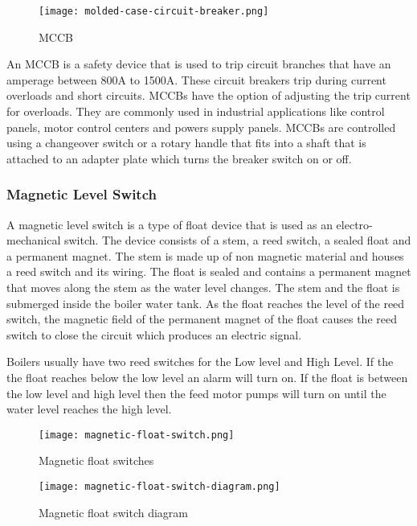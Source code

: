 \documentclass[a4paper,12pt]{article}
\begin{document}
						\begin{figure}[H]
							\centering				
							\texttt{[image: molded-case-circuit-breaker.png]}
							\caption{MCCB}
							\label{fig:molded-case-circuit-breaker}
						\end{figure}
				 An MCCB is a safety device that is used to trip circuit branches that have an amperage between 800A to 1500A.
				 These circuit breakers trip during current overloads and short circuits. MCCBs have the option of adjusting the trip current for overloads. They are commonly used in industrial applications like control panels, motor control centers and powers supply panels. MCCBs are controlled using a changeover switch or a rotary handle that fits into a shaft that is attached to an adapter plate which turns the breaker switch on or off.
				 
				 				 
				\newpage		
				\subsubsection*{Magnetic Level Switch}
						
						A magnetic level switch is a type of float device that is used as an electro-mechanical switch\citep{magnetic-float-switch}.
						The device consists of a stem, a reed switch, a sealed float and a permanent magnet.
						The stem is made up of non magnetic material and houses a reed switch and its wiring. The float is sealed and contains a permanent magnet that moves along the stem as the water level changes. The stem and the float is submerged inside the boiler water tank.
						As the float reaches the level of the reed switch, the magnetic field of the permanent magnet of the float causes the reed switch to close the circuit which produces an electric signal.
						
						Boilers usually have two reed switches for the Low level and High Level.
						If the the float reaches below the low level an alarm will turn on.
						If the float is between the low level and high level then the feed motor pumps will turn on until the water level reaches the high level.  
						 
						\begin{figure}[H]
							\centering				
							\texttt{[image: magnetic-float-switch.png]}
							\caption{Magnetic float switches}
							\label{fig:magnetic-float-switches}
						\end{figure}
						
						\begin{figure}[H]	
							\centering				
								\texttt{[image: magnetic-float-switch-diagram.png]}
							\caption{Magnetic float switch diagram}
							\label{fig:magnetic-float-switch-diagram}
						\end{figure}
						
\end{document}
